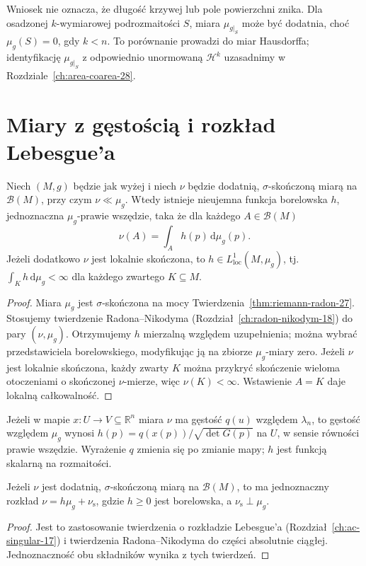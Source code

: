 \begin{uwaga}
Wniosek nie oznacza, że długość krzywej lub pole
powierzchni znika. Dla osadzonej $k$-wymiarowej
podrozmaitości $S$, miara $\mu_{g|_S}$ może być
dodatnia, choć $\mu_g(S)=0$, gdy $k<n$.
To porównanie prowadzi do miar Hausdorffa;
identyfikację $\mu_{g|_S}$ z odpowiednio
unormowaną $\mathcal H^k$ uzasadnimy
w Rozdziale~\ref{ch:area-coarea-28}.
\end{uwaga}

\section{Miary z gęstością i rozkład Lebesgue'a}
\begin{twierdzenie}
\label{thm:rn-manifold-27}
Niech $(M,g)$ będzie jak wyżej i niech
$\nu$ będzie dodatnią, $\sigma$-skończoną
miarą na $\mathcal B(M)$, przy czym
$\nu\ll\mu_g$. Wtedy istnieje nieujemna funkcja
borelowska $h$, jednoznaczna $\mu_g$-prawie
wszędzie, taka że dla każdego $A\in\mathcal B(M)$
\[
 \nu(A)=\int_A h(p)\,\mathrm d\mu_g(p).
\]
Jeżeli dodatkowo $\nu$ jest lokalnie skończona,
to $h\in L^1_{\mathrm{loc}}(M,\mu_g)$,
tj. $\int_K h\,\mathrm d\mu_g<\infty$
dla każdego zwartego $K\subseteq M$.
\end{twierdzenie}
\begin{proof}
Miara $\mu_g$ jest $\sigma$-skończona na mocy
Twierdzenia~\ref{thm:riemann-radon-27}.
Stosujemy twierdzenie Radona--Nikodyma
(Rozdział~\ref{ch:radon-nikodym-18})
do pary $(\nu,\mu_g)$. Otrzymujemy $h$ mierzalną
względem uzupełnienia; można wybrać przedstawiciela
borelowskiego, modyfikując ją na zbiorze
$\mu_g$-miary zero. Jeżeli $\nu$ jest lokalnie
skończona, każdy zwarty $K$ można przykryć
skończenie wieloma otoczeniami o skończonej
$\nu$-mierze, więc $\nu(K)<\infty$.
Wstawienie $A=K$ daje lokalną całkowalność.
\end{proof}

\begin{przyklad}
Jeżeli w mapie $x:U\to V\subseteq\mathbb R^n$
miara $\nu$ ma gęstość $q(u)$ względem $\lambda_n$,
to gęstość względem $\mu_g$ wynosi
$h(p)=q(x(p))/\sqrt{\det G(p)}$
na $U$, w sensie równości prawie wszędzie.
Wyrażenie $q$ zmienia się po zmianie mapy;
$h$ jest funkcją skalarną na rozmaitości.
\end{przyklad}

\begin{twierdzenie}
\label{thm:leb-manifold-27}
Jeżeli $\nu$ jest dodatnią, $\sigma$-skończoną
miarą na $\mathcal B(M)$, to ma jednoznaczny rozkład
$\nu=h\mu_g+\nu_{\mathrm s}$, gdzie
$h\ge0$ jest borelowska, a
$\nu_{\mathrm s}\perp\mu_g$.
\end{twierdzenie}
\begin{proof}
Jest to zastosowanie twierdzenia o rozkładzie
Lebesgue'a (Rozdział~\ref{ch:ac-singular-17})
i twierdzenia Radona--Nikodyma do części
absolutnie ciągłej. Jednoznaczność obu składników
wynika z tych twierdzeń.
\end{proof}

